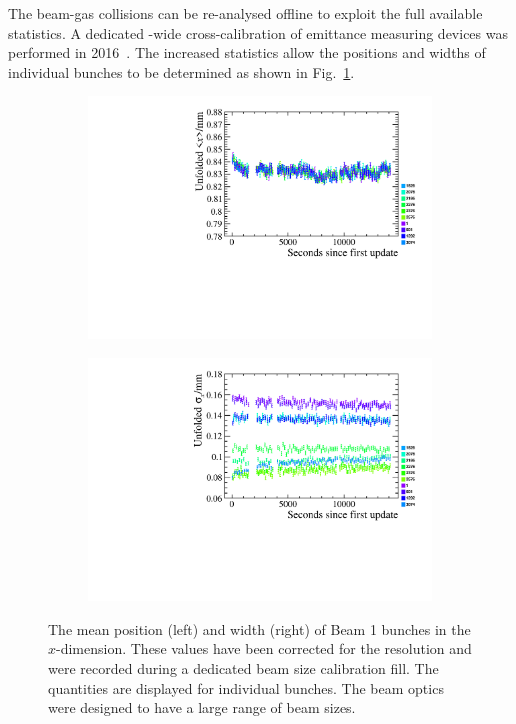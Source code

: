 The beam-gas collisions can be re-analysed offline to exploit the full available statistics. A dedicated \lhc-wide cross-calibration of emittance measuring devices was performed in 2016~\cite{Hadavizadeh:IPAC2017-MOPAB131}. The increased statistics allow the positions and widths of individual bunches to be determined as shown in Fig.~\ref{fig:Dec_bgi_fill}.  


\begin{figure}[!h]
    \centering
    \begin{subfigure}[m]{0.49\textwidth}
        \centering
        \includegraphics[width=1.0\textwidth]{figs/Detector/PerBXID_MeanX_unfolded_Beam1.pdf}
    \end{subfigure}
    \begin{subfigure}[m]{0.49\textwidth}
        \centering
        \includegraphics[width=1.0\textwidth]{figs/Detector/PerBXID_SigmaX_unfolded_Beam1.pdf}
    \end{subfigure}
    \caption{The mean position (left) and width (right) of Beam 1 bunches in the $x$-dimension. These values have been corrected for the \velo resolution and were recorded during a dedicated beam size calibration fill. The quantities are displayed for individual bunches. The beam optics were designed to have a large range of beam sizes. }
    \label{fig:Dec_bgi_fill}   
\end{figure}



